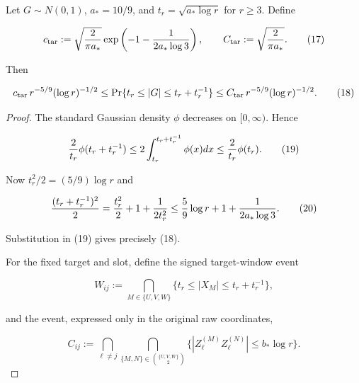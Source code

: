 \begin{lemma}\label{lem:step-002-target-mass}
Let $G\sim N(0,1)$, $a_*=10/9$, and
$t_r=\sqrt{a_*\log r}$ for $r\ge3$. Define

\[
c_{\rm tar}:=\sqrt{2\over\pi a_*}
 \exp\left(-1-{1\over2a_*\log3}\right),
\qquad
C_{\rm tar}:=\sqrt{2\over\pi a_*}.
\tag{17}
\]

Then

\[
c_{\rm tar}\,r^{-5/9}(\log r)^{-1/2}
\le
\Pr\{t_r\le|G|\le t_r+t_r^{-1}\}
\le
C_{\rm tar}\,r^{-5/9}(\log r)^{-1/2}.
\tag{18}
\]

\begin{proof}
The standard Gaussian density $\phi$ decreases on $[0,\infty)$. Hence

\[
{2\over t_r}\phi(t_r+t_r^{-1})
\le2\int_{t_r}^{t_r+t_r^{-1}}\phi(x)dx
\le {2\over t_r}\phi(t_r).
\tag{19}
\]

Now $t_r^2/2=(5/9)\log r$ and

\[
{(t_r+t_r^{-1})^2\over2}
={t_r^2\over2}+1+{1\over2t_r^2}
\le {5\over9}\log r+1+{1\over2a_*\log3}.
\tag{20}
\]

Substitution in (19) gives precisely (18). 


For the fixed target and slot, define the signed target-window event

\[
W_{ij}:=\bigcap_{M\in\{U,V,W\}}
\{t_r\le|X_M|\le t_r+t_r^{-1}\},
\tag{21}
\]

and the event, expressed only in the original raw coordinates,

\[
C_{ij}:=\bigcap_{\ell\ne j}
\bigcap_{\{M,N\}\in\binom{\{U,V,W\}}2}
\{|Z_{\ell}^{(M)}Z_{\ell}^{(N)}|\le b_*\log r\}.
\tag{22}
\]

\end{proof}
\end{lemma}
